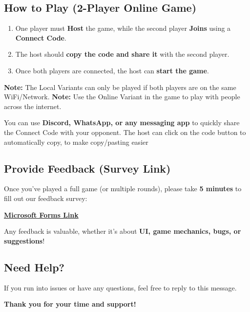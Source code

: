 \documentclass{article}
\begin{document}
\subsection{How to Play (2-Player Online Game)}
\begin{enumerate}
    \item One player must \textbf{Host} the game, while the second player \textbf{Joins} using a \textbf{Connect Code}.
    \item The host should \textbf{copy the code and share it} with the second player.
    \item Once both players are connected, the host can \textbf{start the game}.
\end{enumerate}

\textbf{Note:} The Local Variants can only be played if both players are on the same WiFi/Network.
\textbf{Note:} Use the Online Variant in the game to play with people across the internet.

\begin{tcolorbox}[colback=gray!10, colframe=black, title=Tip]
You can use \textbf{Discord, WhatsApp, or any messaging app} to quickly share the Connect Code with your opponent.
The host can click on the code button to automatically copy, to make copy/pasting easier
\end{tcolorbox}

\subsection{Provide Feedback (Survey Link)}

Once you’ve played a full game (or multiple rounds), please take \textbf{5 minutes} to fill out our feedback survey:

\href{https://forms.office.com/r/gp8yrLXu9v}{\textbf{Microsoft Forms Link}}

Any feedback is valuable, whether it's about \textbf{UI, game mechanics, bugs, or suggestions}!

\subsection{Need Help?}
If you run into issues or have any questions, feel free to reply to this message.

\bigskip

\begin{center}
\textbf{Thank you for your time and support!}
\end{center}
\end{document}
